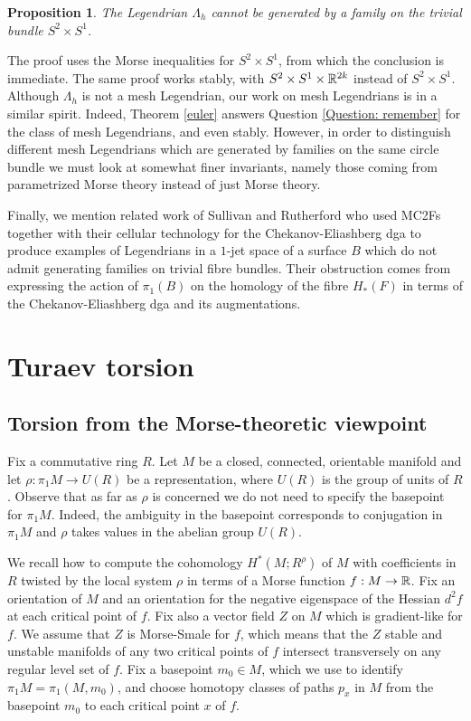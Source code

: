 \documentclass[11pt]{article}
\numberwithin{equation}{section}\providecommand{\dpl}{\displaystyle}
\theoremstyle{plain}
\newtheorem{proposition}[theorem]{Proposition}
\theoremstyle{definition}
\begin{document}
\begin{proposition}
The Legendrian $\Lambda_h$ cannot be generated by a family on the trivial bundle $S^2 \times S^1$.
\end{proposition}

The proof uses the Morse inequalities for $S^2 \times S^1$, from which the conclusion is immediate. The same proof works stably, with $S^2 \times S^1 \times \mathbb{R}^{2k}$ instead of $S^2 \times S^1$. Although $\Lambda_h$ is not a mesh Legendrian, our work on mesh Legendrians is in a similar spirit. Indeed, Theorem \ref{euler} answers Question \ref{Question: remember} for the class of mesh Legendrians, and even stably. However, in order to distinguish different mesh Legendrians which are generated by families on the same circle bundle we must look at somewhat finer invariants, namely those coming from parametrized Morse theory instead of just Morse theory.

Finally, we mention related work of Sullivan and Rutherford \cite{RS18} who used MC2Fs together with their cellular technology for the Chekanov-Eliashberg dga to produce examples of Legendrians in a $1$-jet space of a surface $B$ which do not admit generating families on trivial fibre bundles. Their obstruction comes from expressing the action of $\pi_1(B)$ on the homology of the fibre $H_*(F)$ in terms of the Chekanov-Eliashberg dga and its augmentations.

\section{Turaev torsion}\label{Section: turaev torsion}

\subsection{Torsion from the Morse-theoretic viewpoint}\label{reidemeistertorsion}

Fix a commutative ring $R$. Let $M$ be a closed, connected, orientable manifold and let $\rho: \pi_1M \to U(R)$ be a representation, where $U(R)$ is the group of units of $R$. Observe that as far as $\rho$ is concerned we do not need to specify the basepoint for $\pi_1M$. Indeed, the ambiguity in the basepoint corresponds to conjugation in $\pi_1 M$ and $\rho$ takes values in the abelian group $U(R)$.

We recall how to compute the cohomology $H^*(M; R^\rho)$ of $M$ with coefficients in~$R$ twisted by the local system $\rho$ in terms of a Morse function $f:M \to \mathbb{R}$. Fix an orientation of $M$ and an orientation for the negative eigenspace of the Hessian $d^2f$ at each critical point of $f$. Fix also a vector field $Z$ on $M$ which is gradient-like for $f$. We assume that $Z$ is Morse-Smale for $f$, which means that the $Z$ stable and unstable manifolds of any two critical points of $f$ intersect transversely on any regular level set of $f$. Fix a basepoint $m_0 \in M$, which we use to identify $\pi_1M=\pi_1(M,m_0)$, and choose homotopy classes of paths $p_x$ in $M$ from the basepoint $m_0$ to each critical point $x$ of $f$.
\end{document}
